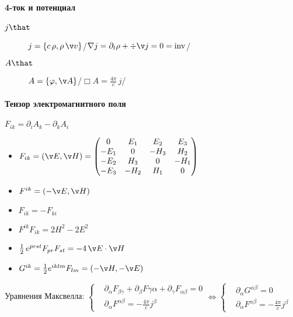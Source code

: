 \documentclass[draft]{trchesh}
\def\waveop{\mathop{\boldsymbol\Box}}
\begin{document}
\begin{multicols*}{3}
\paragraph{4-ток и потенциал}

\begin{description}
\item[$j \that$] $j=\{c\,\rho, \rho\,\v v\}$\hfill /$\nabla j=\partial_t\rho + \div\v j = 0 = \rm inv$/
\item[$A \that$] $A=\{\varphi, \v A\}$\hfill /$\waveop A = \frac{4\pi}{c} \, j$/
\end{description}

\paragraph{Тензор электромагнитного поля}
$F_{ik} = \partial_i A_k - \partial_k A_i$
\begin{itemize}
  \item $F_{ik} = (\v E, \v H) = \begin{pmatrix}
       0   &  E_1  &  E_2  &  E_3 \\
      -E_1 &  0    & -H_3  &  H_2 \\
      -E_2 &  H_3  &  0    & -H_1 \\
      -E_3 & -H_2  &  H_1  &  0   \\
  \end{pmatrix}$
\item $F^{ik} = (-\v E, \v H)$
\item $F_{ik} = -F_{ki}$
\item $F^{ik}F_{ik} = 2 H^2 - 2 E^2$
\item $\frac{1}{2} \, e^{prst} F_{pr} F_{st} = - 4\, \v E \cdot \v H$
\item $G^{ik} = \frac 12 e^{iklm} F_{lm} = (-\v H, -\v E)$
\end{itemize}

Уравнения Максвелла:
$\left\{
\begin{aligned}
  &\partial_\alpha F_{\beta\gamma}+\partial_\beta F{\gamma\alpha}+\partial_\gamma F_{\alpha\beta}=0\\
  &\partial_\alpha F^{\alpha \beta} = - \frac{4\pi}{c} j^\beta  
\end{aligned}\right. \Leftrightarrow
\left\{
\begin{aligned}
  &\partial_\alpha G^{\alpha \beta} = 0 \\
  &\partial_\alpha F^{\alpha \beta} = - \frac{4\pi}{c} j^\beta  
\end{aligned}\right.
$


\end{multicols*}
\end{document}
